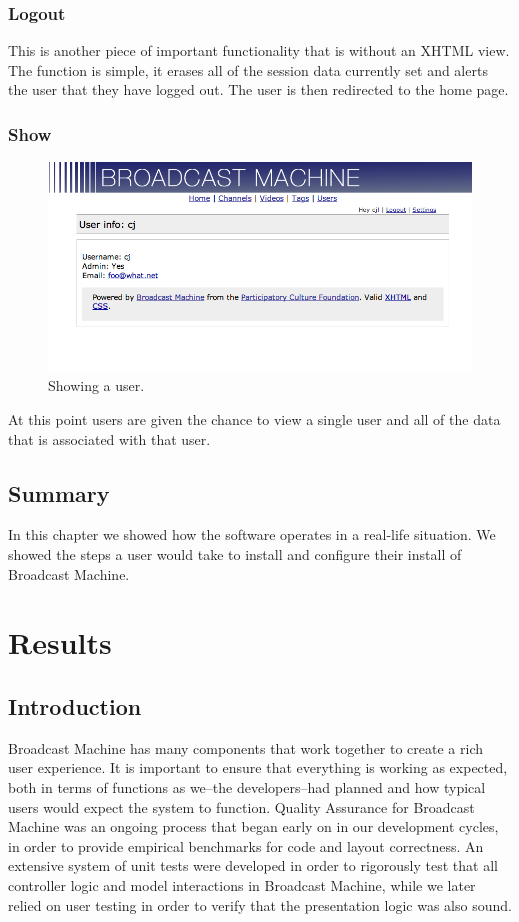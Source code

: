 \documentclass[a4paper,12pt]{report}
\begin{document}
\subsection{Logout}
This is another piece of important functionality that is without an XHTML view.
The function is simple, it erases all of the session data currently set and alerts the user that they have logged out.
The user is then redirected to the home page.

\subsection{Show}
\begin{figure}[htp]
\begin{center}
\includegraphics[width=150mm]{./images/usershow.png}
\end{center}
\caption{Showing a user.}
\end{figure}
At this point users are given the chance to view a single user and all of the data that is associated with that user.

\section{Summary}
In this chapter we showed how the software operates in a real-life situation. We showed the steps a user would take to install and 
configure their install of Broadcast Machine. 

\chapter{Results}

\section{Introduction}
Broadcast Machine has many components that work together to create a rich user experience. It is important to ensure that everything is 
working as expected, both in terms of functions as we--the developers--had planned and how typical users would expect the system to 
function.
Quality Assurance for Broadcast Machine was an ongoing process that began early on in our development cycles, in order to provide 
empirical benchmarks for code and layout correctness. 
An extensive system of unit tests were developed in order to rigorously test that all controller logic and model interactions in Broadcast Machine, while we later relied on user testing in order to verify that the presentation logic was also sound.
\end{document}
